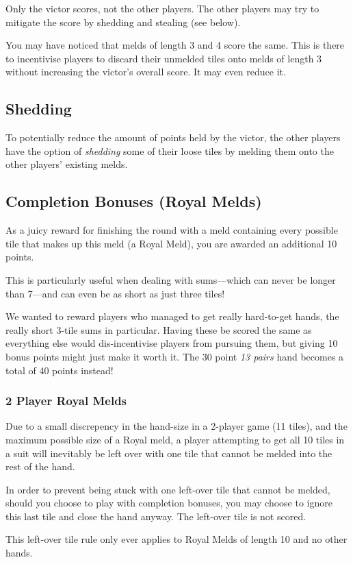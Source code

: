 \note Only the victor scores, not the other players. The other players may try to mitigate the score by shedding and stealing (see below).

\aside You may have noticed that melds of length 3 and 4 score the same. This is there to incentivise players to discard their unmelded tiles onto melds of length 3 without increasing the victor's overall score. It may even reduce it.

\subsection{Shedding}
To potentially reduce the amount of points held by the victor, the other players have the option of \textit{shedding} some of their loose tiles by melding them onto the other players' existing melds.

\subsection{Completion Bonuses (Royal Melds)}
As a juicy reward for finishing the round with a meld containing every possible tile that makes up this meld (a Royal Meld), you are awarded an additional 10 points.

This is particularly useful when dealing with sums---which can never be longer than 7---and can even be as short as just three tiles!

\aside We wanted to reward players who managed to get really hard-to-get hands, the really short 3-tile sums in particular. Having these be scored the same as everything else would dis-incentivise players from pursuing them, but giving 10 bonus points might just make it worth it. The 30 point \textit{13 pairs} hand becomes a total of 40 points instead!

\subsubsection{2 Player Royal Melds}
Due to a small discrepency in the hand-size in a 2-player game (11 tiles), and the maximum possible size of a Royal meld, a player attempting to get all 10 tiles in a suit will inevitably be left over with one tile that cannot be melded into the rest of the hand.

In order to prevent being stuck with one left-over tile that cannot be melded, should you choose to play with completion bonuses, you may choose to ignore this last tile and close the hand anyway. The left-over tile is not scored.

\note This left-over tile rule only ever applies to Royal Melds of length 10 and no other hands.
